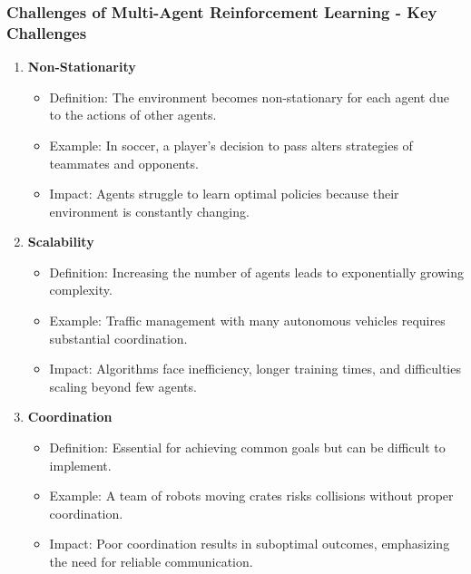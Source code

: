 \documentclass[aspectratio=169]{beamer}
\begin{document}
\begin{frame}[fragile]
    \frametitle{Challenges of Multi-Agent Reinforcement Learning - Key Challenges}
    \begin{enumerate}
        \item \textbf{Non-Stationarity}
        \begin{itemize}
            \item Definition: The environment becomes non-stationary for each agent due to the actions of other agents.
            \item Example: In soccer, a player's decision to pass alters strategies of teammates and opponents.
            \item Impact: Agents struggle to learn optimal policies because their environment is constantly changing.
        \end{itemize}

        \item \textbf{Scalability}
        \begin{itemize}
            \item Definition: Increasing the number of agents leads to exponentially growing complexity.
            \item Example: Traffic management with many autonomous vehicles requires substantial coordination.
            \item Impact: Algorithms face inefficiency, longer training times, and difficulties scaling beyond few agents.
        \end{itemize}

        \item \textbf{Coordination}
        \begin{itemize}
            \item Definition: Essential for achieving common goals but can be difficult to implement.
            \item Example: A team of robots moving crates risks collisions without proper coordination.
            \item Impact: Poor coordination results in suboptimal outcomes, emphasizing the need for reliable communication.
        \end{itemize}
    \end{enumerate}
\end{frame}
\end{document}
